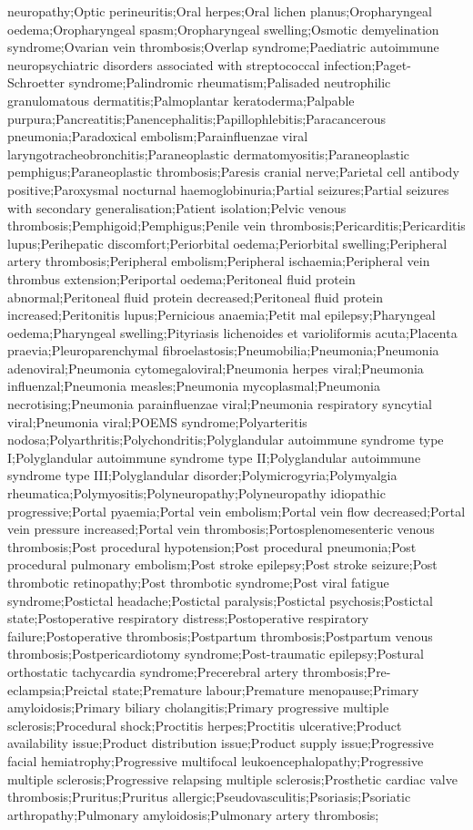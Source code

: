 \begin{refsection}
\begin{tcolorbox}[quote]
neuropathy;Optic perineuritis;Oral herpes;Oral lichen planus;Oropharyngeal oedema;Oropharyngeal spasm;Oropharyngeal swelling;Osmotic demyelination syndrome;Ovarian vein thrombosis;Overlap syndrome;Paediatric autoimmune neuropsychiatric disorders associated with streptococcal infection;Paget-Schroetter syndrome;Palindromic rheumatism;Palisaded neutrophilic granulomatous dermatitis;Palmoplantar keratoderma;Palpable purpura;Pancreatitis;Panencephalitis;Papillophlebitis;Paracancerous pneumonia;Paradoxical embolism;Parainfluenzae viral laryngotracheobronchitis;Paraneoplastic dermatomyositis;Paraneoplastic pemphigus;Paraneoplastic thrombosis;Paresis cranial nerve;Parietal cell antibody positive;Paroxysmal nocturnal haemoglobinuria;Partial seizures;Partial seizures with secondary generalisation;Patient isolation;Pelvic venous thrombosis;Pemphigoid;Pemphigus;Penile vein thrombosis;Pericarditis;Pericarditis lupus;Perihepatic discomfort;Periorbital oedema;Periorbital swelling;Peripheral artery thrombosis;Peripheral embolism;Peripheral ischaemia;Peripheral vein thrombus extension;Periportal oedema;Peritoneal fluid protein abnormal;Peritoneal fluid protein decreased;Peritoneal fluid protein increased;Peritonitis lupus;Pernicious anaemia;Petit mal epilepsy;Pharyngeal oedema;Pharyngeal swelling;Pityriasis lichenoides et varioliformis acuta;Placenta praevia;Pleuroparenchymal fibroelastosis;Pneumobilia;Pneumonia;Pneumonia adenoviral;Pneumonia cytomegaloviral;Pneumonia herpes viral;Pneumonia influenzal;Pneumonia measles;Pneumonia mycoplasmal;Pneumonia necrotising;Pneumonia parainfluenzae viral;Pneumonia respiratory syncytial viral;Pneumonia viral;POEMS syndrome;Polyarteritis nodosa;Polyarthritis;Polychondritis;Polyglandular autoimmune syndrome type I;Polyglandular autoimmune syndrome type II;Polyglandular autoimmune syndrome type III;Polyglandular disorder;Polymicrogyria;Polymyalgia rheumatica;Polymyositis;Polyneuropathy;Polyneuropathy idiopathic progressive;Portal pyaemia;Portal vein embolism;Portal vein flow decreased;Portal vein pressure increased;Portal vein thrombosis;Portosplenomesenteric venous thrombosis;Post procedural hypotension;Post procedural pneumonia;Post procedural pulmonary embolism;Post stroke epilepsy;Post stroke seizure;Post thrombotic retinopathy;Post thrombotic syndrome;Post viral fatigue syndrome;Postictal headache;Postictal paralysis;Postictal psychosis;Postictal state;Postoperative respiratory distress;Postoperative respiratory failure;Postoperative thrombosis;Postpartum thrombosis;Postpartum venous thrombosis;Postpericardiotomy syndrome;Post-traumatic epilepsy;Postural orthostatic tachycardia syndrome;Precerebral artery thrombosis;Pre-eclampsia;Preictal state;Premature labour;Premature menopause;Primary amyloidosis;Primary biliary cholangitis;Primary progressive multiple sclerosis;Procedural shock;Proctitis herpes;Proctitis ulcerative;Product availability issue;Product distribution issue;Product supply issue;Progressive facial hemiatrophy;Progressive multifocal leukoencephalopathy;Progressive multiple sclerosis;Progressive relapsing multiple sclerosis;Prosthetic cardiac valve thrombosis;Pruritus;Pruritus allergic;Pseudovasculitis;Psoriasis;Psoriatic arthropathy;Pulmonary amyloidosis;Pulmonary artery thrombosis; 
\end{tcolorbox}
\end{refsection}
